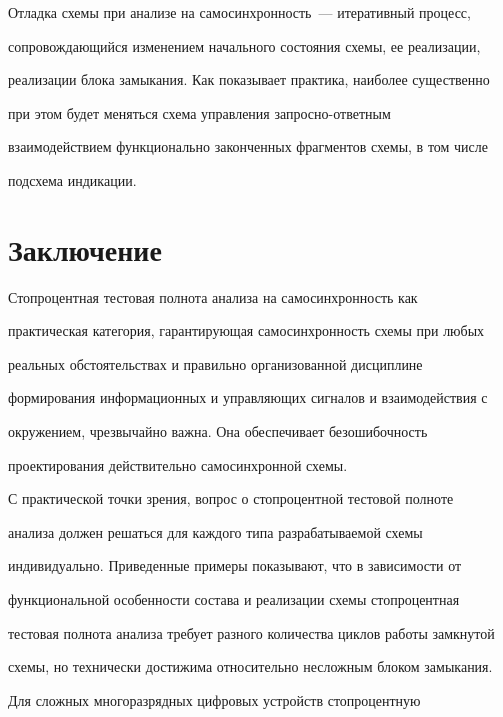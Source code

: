       


      Отладка схемы при анализе на самосинхронность~--- итеративный процесс, 


сопровождающийся изменением начального состояния схемы, ее реализации, 


реализации блока замыкания. Как показывает практика, наиболее существенно 


при этом будет меняться схема управления за\-прос\-но-от\-вет\-ным 


взаимодействием функционально законченных фрагментов схемы, в том числе 


подсхема индикации.


      


      \section{Заключение}


      


      Стопроцентная тестовая полнота анализа на самосинхронность как 


практическая категория, гарантирующая самосинхронность схемы при любых 


реальных обстоятельствах и правильно организованной дисциплине 


формирования информационных и управляющих сигналов и взаимодействия с 


окружением, чрезвычайно важна. Она обеспечивает безошибочность 


проектирования действительно самосинхронной схемы.


      


      С практической точки зрения, вопрос о стопроцентной тестовой полноте 


анализа должен решаться для каждого типа разрабатываемой схемы 


индивидуально. Приведенные примеры показывают, что в зависимости от 


функциональной особенности состава и реализации схемы стопроцентная 


тестовая полнота анализа требует разного количества циклов работы замкнутой 


схемы, но технически достижима относительно несложным блоком замыкания.


      


      Для сложных многоразрядных цифровых устройств стопроцентную 


